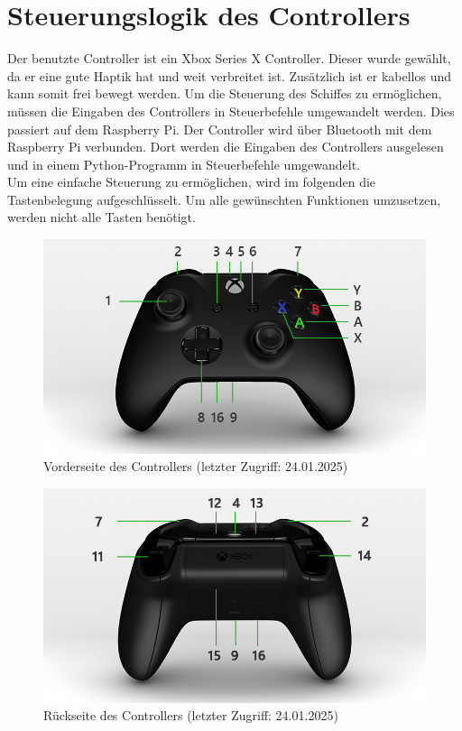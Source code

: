 \section{Steuerungslogik des Controllers}
Der benutzte Controller ist ein Xbox Series X Controller. Dieser wurde gewählt, da er eine gute Haptik hat und weit
verbreitet ist. Zusätzlich ist er kabellos und kann somit frei bewegt werden. Um die Steuerung des Schiffes zu
ermöglichen, müssen die Eingaben des Controllers in Steuerbefehle umgewandelt werden. Dies passiert auf dem 
Raspberry Pi. Der Controller wird über Bluetooth mit dem Raspberry Pi verbunden. Dort werden die Eingaben des Controllers
ausgelesen und in einem Python-Programm in Steuerbefehle umgewandelt. \\
Um eine einfache Steuerung zu ermöglichen, wird im folgenden die Tastenbelegung aufgeschlüsselt.
Um alle gewünschten Funktionen umzusetzen, werden nicht alle Tasten benötigt. 

\begin{figure}[H]
    \centering
    \includegraphics[scale=0.5]{images/vorderseite.jpg}
    \caption{Vorderseite des Controllers \cite{XboxController}(letzter Zugriff: 24.01.2025)}
    \label{fig:vorderseite}
\end{figure}

\begin{figure}[H]
    \centering
    \includegraphics[scale=0.5]{images/rueckseite.jpg}
    \caption{Rückseite des Controllers \cite{XboxController}(letzter Zugriff: 24.01.2025)}
    \label{fig:rueckseite}
\end{figure}

